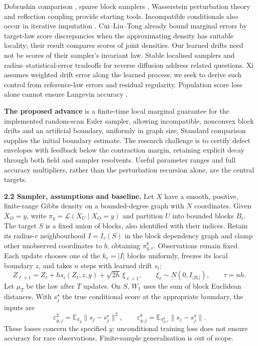 \documentclass[12pt,a4paper]{article}
\newcommand{\E}{\mathbb E}
\newcommand{\W}{W_1}
\newcommand{\piy}{\pi_y}
\newcommand{\pir}{\pi_{y,r}^{b}}
\begin{document}
Dobrushin comparison \cite{Dob70,RvH14}, sparse block samplers \cite{TMM20}, Wasserstein perturbation theory \cite{RS18} and reflection coupling \cite{Eberle16,MMS20} provide starting tools. Incompatible conditionals also occur in iterative imputation \cite{LGHSK14}. Cui--Liu--Tong \cite{CLT} already bound marginal errors by target-law score discrepancies when the approximating density has suitable locality; their result compares scores of joint densities. Our learned drifts need not be scores of their sampler's invariant law. Stable localised samplers \cite{GR26} and radius--statistical-error tradeoffs for reverse diffusion \cite{GLMRT} address related questions. Xi \cite{Xi26} assumes weighted drift error along the learned process; we seek to derive such control from reference-law errors and residual regularity. Population score loss alone cannot ensure Langevin accuracy \cite{CCSW26}.

\textbf{The proposed advance} is a finite-time local marginal guarantee for the implemented random-scan Euler sampler, allowing incompatible, nonconvex block drifts and an artificial boundary, uniformly in graph size. Standard comparison supplies the initial boundary estimate. The research challenge is to certify defect envelopes with feedback below the contraction margin, retaining explicit decay through both field and sampler resolvents. Useful parameter ranges and full accuracy multipliers, rather than the perturbation recursion alone, are the central targets.

\textbf{2.2 Sampler, assumptions and baseline.}
Let $X$ have a smooth, positive, finite-range Gibbs density on a bounded-degree graph with $N$ coordinates. Given $X_O=y$, write $\piy=\mathcal L(X_U\mid X_O=y)$ and partition $U$ into bounded blocks $B_i$. The target $S$ is a fixed union of blocks, also identified with their indices. Retain its radius-$r$ neighbourhood $I=I_r(S)$ in the block dependency graph and clamp other unobserved coordinates to $b$, obtaining $\pir$. Observations remain fixed. Each update chooses one of the $k_r=|I|$ blocks uniformly, freezes its local boundary $z$, and takes $n$ steps with learned drift $s_i$:
\begin{equation}\label{eq:update}
 Z_{\ell+1}=Z_\ell+h s_i(Z_\ell,z,y)+\sqrt{2h}\,\xi_{\ell+1},
 \qquad \xi_\ell\sim N(0,I_{|B_i|}),\qquad \tau=nh.
\end{equation}
Let $\mu_T$ be the law after $T$ updates. On $S$, $\W$ uses the sum of block Euclidean distances. With $s_j^\star$ the true conditional score at the appropriate boundary, the inputs are
\[
 \varepsilon_{y,j}^2=\E_{\piy}\|s_j-s_j^\star\|^2,
 \qquad \varepsilon^b_{y,j}=\E_{\pir}\|s_j-s_j^\star\|.
\]
These losses concern the specified $y$; unconditional training loss does not ensure accuracy for rare observations. Finite-sample generalisation is out of scope.
\end{document}

